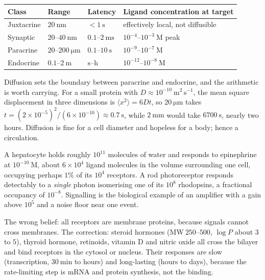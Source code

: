 \begin{tabular}{@{}lllp{3.0cm}@{}}
\toprule
\textbf{Class} & \textbf{Range} & \textbf{Latency} & \textbf{Ligand concentration at target}\\
\midrule
Juxtacrine & $20\ \mathrm{nm}$ & $<1\ \mathrm{s}$ & effectively local, not diffusible\\
Synaptic & $20$--$40\ \mathrm{nm}$ & $0.1$--$2\ \mathrm{ms}$ & $10^{-4}$--$10^{-3}\ \mathrm{M}$ peak\\
Paracrine & $20$--$200\ \mathrm{\mu m}$ & $0.1$--$10\ \mathrm{s}$ & $10^{-9}$--$10^{-7}\ \mathrm{M}$\\
Endocrine & $0.1$--$2\ \mathrm{m}$ & $\mathrm{s}$--$\mathrm{h}$ & $10^{-12}$--$10^{-8}\ \mathrm{M}$\\
\bottomrule
\end{tabular}

Diffusion sets the boundary between paracrine and endocrine, and the arithmetic is
worth carrying. For a small protein with $D \approx 10^{-10}\ \mathrm{m^2\,s^{-1}}$,
the mean square displacement in three dimensions is $\langle x^2 \rangle = 6Dt$, so
$20\ \mathrm{\mu m}$ takes $t = (2\times10^{-5})^2/(6\times10^{-10}) \approx
0.7\ \mathrm{s}$, while $2\ \mathrm{mm}$ would take $6700\ \mathrm{s}$, nearly two
hours. Diffusion is fine for a cell diameter and hopeless for a body; hence a
circulation.

\begin{obsbox}[title={WORTH NOTICING: one molecule in a billion}]
A hepatocyte holds roughly $10^{11}$ molecules of water and responds to epinephrine at
$10^{-10}\ \mathrm{M}$, about $6\times10^{4}$ ligand molecules in the volume
surrounding one cell, occupying perhaps $1\%$ of its $10^{4}$ receptors. A rod
photoreceptor responds detectably to a \emph{single} photon isomerising one of its
$10^{8}$ rhodopsins, a fractional occupancy of $10^{-8}$. Signalling is the biological
example of an amplifier with a gain above $10^{5}$ and a noise floor near one event.
\end{obsbox}

\begin{warnbox}[title={TRAP: reception does not have to happen at the surface}]
The wrong belief: all receptors are membrane proteins, because signals cannot cross
membranes. The correction: steroid hormones ($\mathrm{MW}\ 250$--$500$, $\log P$
about $3$ to $5$), thyroid hormone, retinoids, vitamin D and nitric oxide all cross
the bilayer and bind receptors in the cytosol or nucleus. Their responses are slow
(transcription, $30\ \mathrm{min}$ to hours) and long-lasting (hours to days),
because the rate-limiting step is mRNA and protein synthesis, not the binding.
\end{warnbox}

